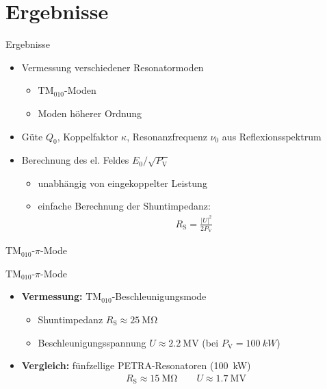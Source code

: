 \documentclass[12pt,xcolor=dvipsnames,professionalfonts]{beamer}
\begin{document}
\section{Ergebnisse}
\begin{frame}{Ergebnisse}
	\begin{itemize}
		\setlength\itemsep{1.25em}
		\item Vermessung verschiedener Resonatormoden	
		\begin{itemize}
			\setlength\itemsep{0.25em}
			\item $\mathrm{TM}_{010}$-Moden
			\item Moden höherer Ordnung
		\end{itemize}
		
		\item Güte $Q_0$, Koppelfaktor $\kappa$, Resonanzfrequenz $\nu_0$ aus Reflexionsspektrum
		
		\item Berechnung des el. Feldes $E_0 / \sqrt{P_\mathrm{V}}$
		\begin{itemize}
			\setlength\itemsep{0.25em}
			\item unabhängig von eingekoppelter Leistung
			\item einfache Berechnung der Shuntimpedanz:
			\begin{align*}
			R_\mathrm{S} = \frac{|U|^2}{2 P_\mathrm{V}}
			\end{align*}
			
		\end{itemize}
	\end{itemize}
\end{frame}

\begin{frame}{$\text{TM}_{010}$-$\pi$-Mode}
	\centering
	
\end{frame}
\begin{frame}{$\text{TM}_{010}$-$\pi$-Mode}
	\addtocounter{framenumber}{-1}
	\centering
	
\end{frame}

\begin{frame}
	\begin{itemize}
		\setlength\itemsep{1.25em}
		\item \textbf{Vermessung:} $\mathrm{TM}_{010}$-Beschleunigungsmode
		\begin{itemize}
			\setlength\itemsep{0.25em}
			\item Shuntimpedanz $R_\mathrm{S} \approx \SI{25}{\mega\ohm}$
			\item Beschleunigungsspannung $U \approx \SI{2.2}{\mega\volt}$ (bei $P_\mathrm{V} = \SI{100}{kW}$)
		\end{itemize}
		
		\item \textbf{Vergleich:} fünfzellige PETRA-Resonatoren (\SI{100}{\kilo\watt})
		\begin{align*}
			R_\mathrm{S} \approx \SI{15}{\mega\ohm} \qquad U \approx \SI{1.7}{\mega\volt}
		\end{align*}
	\end{itemize}
\end{frame}
\end{document}
